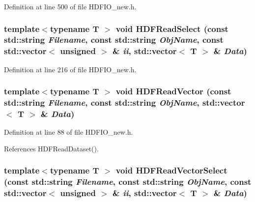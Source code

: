 Definition at line 500 of file HDFIO\_\-new.h.

\subsubsection[{HDFReadSelect}]{\setlength{\rightskip}{0pt plus 5cm}template$<$typename T $>$ void HDFReadSelect (const std::string {\em Filename}, \/  const std::string {\em ObjName}, \/  const std::vector$<$ unsigned $>$ \& {\em ii}, \/  std::vector$<$ T $>$ \& {\em Data})}\label{HDFIO__new_8h_a7cb9cfc97460cc46d8958d73abf37401}


Definition at line 216 of file HDFIO\_\-new.h.

\subsubsection[{HDFReadVector}]{\setlength{\rightskip}{0pt plus 5cm}template$<$typename T $>$ void HDFReadVector (const std::string {\em Filename}, \/  const std::string {\em ObjName}, \/  std::vector$<$ T $>$ \& {\em Data})}\label{HDFIO__new_8h_a7a9e328246922cdfce8ad23cb4040e9b}


Definition at line 88 of file HDFIO\_\-new.h.



References HDFReadDataset().

\subsubsection[{HDFReadVectorSelect}]{\setlength{\rightskip}{0pt plus 5cm}template$<$typename T $>$ void HDFReadVectorSelect (const std::string {\em Filename}, \/  const std::string {\em ObjName}, \/  const std::vector$<$ unsigned $>$ \& {\em ii}, \/  std::vector$<$ T $>$ \& {\em Data})}\label{HDFIO__new_8h_a5ad5843a221c83e26337a48786e1ef4f}


